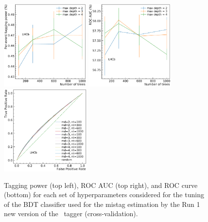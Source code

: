 \begin{figure}[t]
  \centering
        \includegraphics[width=0.4\textwidth]{04FlavourTagging/figs/OSelectronOpt/2018-01-09-vibattis-OSElectron-bdt-crossvalidation-sWeights_Run1/crossval_tp.pdf}
        \includegraphics[width=0.4\textwidth]{04FlavourTagging/figs/OSelectronOpt/2018-01-09-vibattis-OSElectron-bdt-crossvalidation-sWeights_Run1/crossval_roc_auc.pdf} \\
        \includegraphics[width=0.4\textwidth]{04FlavourTagging/figs/OSelectronOpt/2018-01-09-vibattis-OSElectron-bdt-crossvalidation-sWeights_Run1/roc_curve.pdf} \\
        \vspace{-2mm}
        \caption{Tagging power (top left), ROC AUC (top right), and ROC curve (bottom) for each set of hyperparameters considered
          for the tuning of the BDT classifier used for the mistag estimation by the Run 1 new version of the \OSe~tagger (cross-validation).}
        \label{fig:OSecrossvalidationRunI}
\end{figure}
